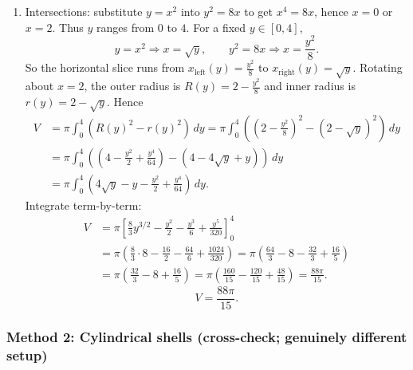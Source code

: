 \documentclass[12pt]{article}
\begin{document}
\begin{enumerate}[label=(\alph*)]
\item Intersections: substitute \(y=x^2\) into \(y^2=8x\) to get \(x^4=8x\), hence \(x=0\) or \(x=2\). Thus \(y\) ranges from \(0\) to \(4\).
For a fixed \(y\in[0,4]\),
\[
y=x^2 \Rightarrow x=\sqrt{y},\qquad
y^2=8x \Rightarrow x=\frac{y^2}{8}.
\]
So the horizontal slice runs from \(x_{\text{left}}(y)=\frac{y^2}{8}\) to \(x_{\text{right}}(y)=\sqrt{y}\).
Rotating about \(x=2\), the outer radius is \(R(y)=2-\frac{y^2}{8}\) and inner radius is \(r(y)=2-\sqrt{y}\).
Hence
\begin{align*}
V
&=\pi\int_{0}^{4}\left(R(y)^2-r(y)^2\right)\,dy
=\pi\int_{0}^{4}\left(\left(2-\frac{y^2}{8}\right)^2-\left(2-\sqrt{y}\right)^2\right)\,dy\\
&=\pi\int_{0}^{4}\left(\left(4-\frac{y^2}{2}+\frac{y^4}{64}\right)-\left(4-4\sqrt{y}+y\right)\right)\,dy\\
&=\pi\int_{0}^{4}\left(4\sqrt{y}-y-\frac{y^2}{2}+\frac{y^4}{64}\right)\,dy.
\end{align*}
Integrate term-by-term:
\begin{align*}
V
&=\pi\left[\frac{8}{3}y^{3/2}-\frac{y^2}{2}-\frac{y^3}{6}+\frac{y^5}{320}\right]_{0}^{4}\\
&=\pi\left(\frac{8}{3}\cdot 8-\frac{16}{2}-\frac{64}{6}+\frac{1024}{320}\right)
=\pi\left(\frac{64}{3}-8-\frac{32}{3}+\frac{16}{5}\right)\\
&=\pi\left(\frac{32}{3}-8+\frac{16}{5}\right)
=\pi\left(\frac{160}{15}-\frac{120}{15}+\frac{48}{15}\right)
=\frac{88\pi}{15}.
\end{align*}
\[
\boxed{V=\frac{88\pi}{15}.}
\]
\end{enumerate}

\subsubsection*{Method 2: Cylindrical shells (cross-check; genuinely different setup)}
\end{document}
